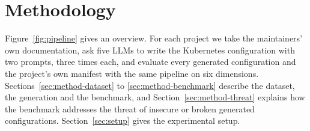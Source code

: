 \section{Methodology}\label{sec:methodology}

Figure~\ref{fig:pipeline} gives an overview. For each project we take the maintainers' own documentation, ask five LLMs to write the Kubernetes configuration with two prompts, three times each, and evaluate every generated configuration and the project's own manifest with the same pipeline on six dimensions. Sections~\ref{sec:method-dataset} to \ref{sec:method-benchmark} describe the dataset, the generation and the benchmark, and Section~\ref{sec:method-threat} explains how the benchmark addresses the threat of insecure or broken generated configurations. Section~\ref{sec:setup} gives the experimental setup.

